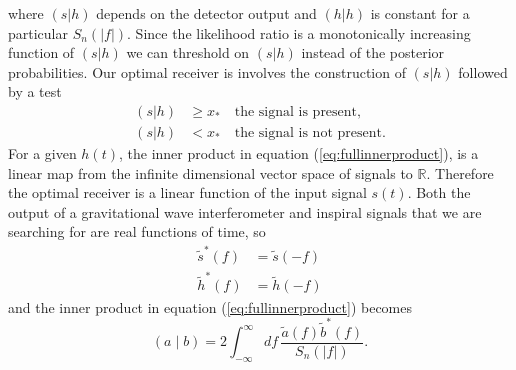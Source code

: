 where $(s|h)$ depends on the detector output and $(h|h)$ is constant for a
particular $S_n(|f|)$. Since the likelihood ratio is a monotonically
increasing function of $(s|h)$ we can threshold on $(s|h)$ instead of the
posterior probabilities. Our optimal receiver is involves the construction of
$(s|h)$ followed by a test
\begin{equation}
\begin{split}
(s|h) &\ge x_\ast \quad \text{the signal is present}, \\
(s|h) &< x_\ast \quad \text{the signal is not present}.
\end{split}
\end{equation}
For a given $h(t)$, the inner
product in equation (\ref{eq:fullinnerproduct}), is a linear map from the
infinite dimensional vector space of signals to $\mathbb{R}$. Therefore the
optimal receiver is a linear function of the input signal $s(t)$. Both the
output of a gravitational wave interferometer and inspiral signals that we are
searching for are real functions of time, so 
\begin{align}
\tilde{s}^\ast(f) &= \tilde{s}(-f) \\
\tilde{h}^\ast(f) &= \tilde{h}(-f)
\end{align}
and the inner product in equation (\ref{eq:fullinnerproduct}) becomes
\begin{equation}
\left(a\mid b\right) = 2 \int_{-\infty}^{\infty}df\,
\frac{\tilde{a}(f)\tilde{b}^\ast(f)}{S_n\left(\left|f\right|\right)}.
\label{eq:innerproduct}
\end{equation}

